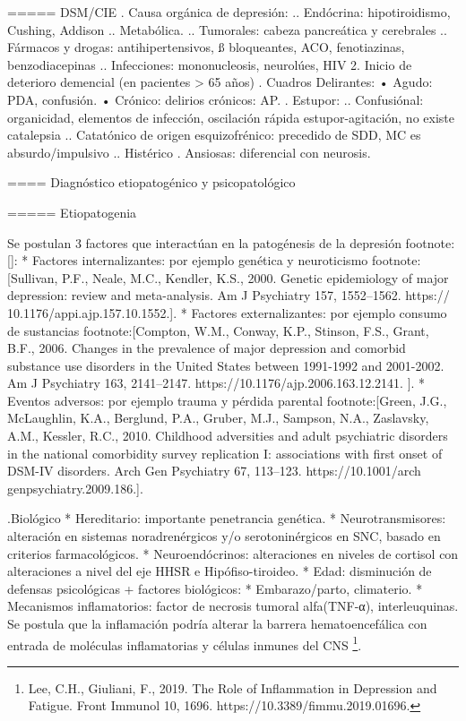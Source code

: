 ===== DSM/CIE
. Causa orgánica de depresión:
.. Endócrina: hipotiroidismo, Cushing, Addison
.. Metabólica.
.. Tumorales: cabeza pancreática y cerebrales
.. Fármacos y drogas: antihipertensivos, ß bloqueantes, ACO, fenotiazinas, benzodiacepinas
.. Infecciones: mononucleosis, neurolúes, HIV 2. Inicio de deterioro demencial (en pacientes > 65 años)
. Cuadros Delirantes: • Agudo: PDA, confusión. • Crónico: delirios crónicos: AP.
. Estupor:
.. Confusiónal: organicidad, elementos de infección, oscilación rápida estupor-agitación, no existe catalepsia
.. Catatónico de origen esquizofrénico: precedido de SDD, MC es absurdo/impulsivo
.. Histérico
. Ansiosas: diferencial con neurosis.

==== Diagnóstico etiopatogénico y psicopatológico

===== Etiopatogenia

Se postulan 3 factores que interactúan en la patogénesis de la depresión footnote:[]:
* Factores internalizantes: por ejemplo genética y neuroticismo footnote:[Sullivan, P.F., Neale, M.C., Kendler, K.S., 2000. Genetic epidemiology of major
depression: review and meta-analysis. Am J Psychiatry 157, 1552–1562. https://
10.1176/appi.ajp.157.10.1552.].
* Factores externalizantes: por ejemplo consumo de sustancias footnote:[Compton, W.M., Conway, K.P., Stinson, F.S., Grant, B.F., 2006. Changes in the
prevalence of major depression and comorbid substance use disorders in the United
States between 1991-1992 and 2001-2002. Am J Psychiatry 163, 2141–2147.
https://10.1176/ajp.2006.163.12.2141. ].
* Eventos adversos: por ejemplo trauma y pérdida parental footnote:[Green, J.G., McLaughlin, K.A., Berglund, P.A., Gruber, M.J., Sampson, N.A.,
Zaslavsky, A.M., Kessler, R.C., 2010. Childhood adversities and adult psychiatric
disorders in the national comorbidity survey replication I: associations with first
onset of DSM-IV disorders. Arch Gen Psychiatry 67, 113–123. https://10.1001/arch
genpsychiatry.2009.186.].

.Biológico
* Hereditario: importante penetrancia genética.
* Neurotransmisores: alteración en sistemas noradrenérgicos y/o serotoninérgicos en SNC, basado en criterios farmacológicos.
* Neuroendócrinos: alteraciones en niveles de cortisol con alteraciones a nivel del eje HHSR e Hipófiso-tiroideo.
* Edad: disminución de defensas psicológicas + factores biológicos:
* Embarazo/parto, climaterio.
* Mecanismos inflamatorios: factor de necrosis tumoral alfa(TNF-α), interleuquinas. Se postula que la inflamación podría alterar la barrera hematoencefálica con entrada de moléculas inflamatorias y células inmunes del CNS \footnote{Lee, C.H., Giuliani, F., 2019. The Role of Inflammation in Depression and Fatigue. Front
Immunol 10, 1696. https://10.3389/fimmu.2019.01696.}.

